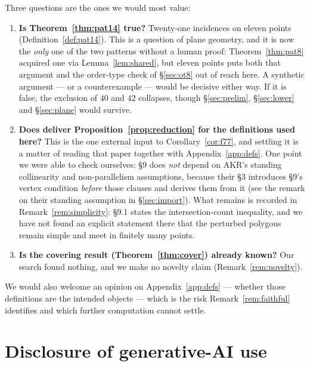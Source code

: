 \documentclass[11pt,a4paper]{article}
\theoremstyle{plain}
\theoremstyle{definition}
\theoremstyle{remark}
\begin{document}
Three questions are the ones we would most value:

\begin{enumerate}[leftmargin=*]
  \item \textbf{Is Theorem~\ref{thm:pat14} true?} Twenty-one incidences on
    eleven points (Definition~\ref{def:pat14}). This is a question of plane
    geometry, and it is now the \emph{only} one of the two patterns without a
    human proof: Theorem~\ref{thm:pat8} acquired one via
    Lemma~\ref{lem:shared}, but eleven points puts both that argument and the
    order-type check of \S\ref{sec:ot8} out of reach here. A synthetic
    argument --- or a counterexample --- would be decisive either way. If it is
    false, the exclusion of $40$ and $42$ collapses, though
    \S\ref{sec:prelim}, \S\ref{sec:lower} and \S\ref{sec:plane} would
    survive.
  \item \textbf{Does \cite[\S9.1]{AckermanKeszeghRote2022} deliver
    Proposition~\ref{prop:reduction} for the definitions used here?} This is
    the one external input to Corollary~\ref{cor:f77}, and settling it is a
    matter of reading that paper together with Appendix~\ref{app:defs}. One
    point we were able to check ourselves: \S9 does \emph{not} depend on AKR's
    standing collinearity and non-parallelism assumptions, because their \S3
    introduces \S9's vertex condition \emph{before} those clauses and derives
    them from it (see the remark on their standing assumption in
    \S\ref{sec:import}). What remains is recorded in
    Remark~\ref{rem:simplicity}: \S9.1 states the intersection-count
    inequality, and we have not found an explicit statement there that the
    perturbed polygons remain simple and meet in finitely many points.
  \item \textbf{Is the covering result (Theorem~\ref{thm:cover}) already known?}
    Our search found nothing, and we make no novelty claim
    (Remark~\ref{rem:novelty}).
\end{enumerate}

We would also welcome an opinion on Appendix~\ref{app:defs} --- whether those
definitions are the intended objects --- which is the risk
Remark~\ref{rem:faithful} identifies and which further computation cannot
settle.

\section*{Disclosure of generative-AI use}\label{sec:ai}
\end{document}
